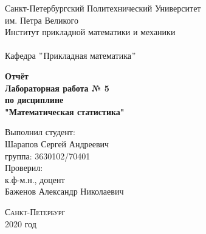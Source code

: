 \documentclass[a4]{article}
\begin{document}



\def\contentsname{\LARGE{Содержание}}
\thispagestyle{empty}
	\begin{center} 
	\vspace{2cm} 
	{\Large \sc Санкт-Петербургский Политехнический Университет}\\
	\vspace{2mm}
	{\Large\sc им. Петра Великого}\\
	\vspace{1cm}
	{\large \sc Институт прикладной математики и механики\\ 
		\vspace{0.5mm}
		\textsc{}}\\ 
	\vspace{0.5mm}
	{\large\sc Кафедра $"$Прикладная математика$"$}\\
	\vspace{15mm}
	
	
	{\sc \textbf{Отчёт\\
			Лабораторная работа № 5\\
			по дисциплине\\
			"Математическая статистика"}
		\vspace{6mm}
		
	}
	\vspace*{2mm}
	
	
	\begin{flushleft}
		\vspace{4cm}
		\sc Выполнил студент:\\
		\sc Шарапов Сергей Андреевич\\
		\sc группа: 3630102/70401\\
		\vspace{1cm}
		\sc Проверил:\\
		\sc к.ф-м.н., доцент\\
		\sc Баженов Александр Николаевич
		\vspace{20mm}
	\end{flushleft}
\end{center} 
\begin{center}
	\vfill {\large\textsc{Санкт-Петербург}}\\ 
	2020 год
\end{center}


\newpage
\pagestyle{plain}
\end{document}
